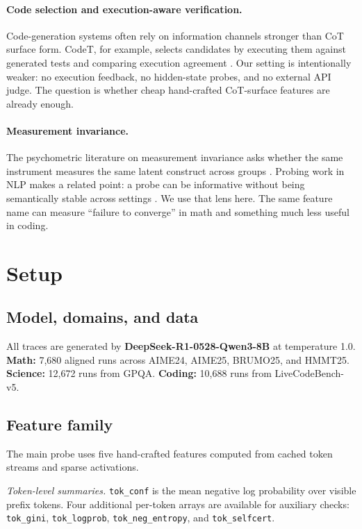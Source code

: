 \documentclass[10pt,twocolumn]{article}
\begin{document}
\paragraph{Code selection and execution-aware verification.}
Code-generation systems often rely on information channels stronger than CoT surface form. CodeT, for example, selects candidates by executing them against generated tests and comparing execution agreement \citep{chen2022codet}. Our setting is intentionally weaker: no execution feedback, no hidden-state probes, and no external API judge. The question is whether cheap hand-crafted CoT-surface features are already enough.

\paragraph{Measurement invariance.}
The psychometric literature on measurement invariance asks whether the same instrument measures the same latent construct across groups \citep{vandenberg2000review}. Probing work in NLP makes a related point: a probe can be informative without being semantically stable across settings \citep{belinkov2022probing}. We use that lens here. The same feature name can measure ``failure to converge'' in math and something much less useful in coding.

\section{Setup}
\label{sec:setup}

\subsection{Model, domains, and data}

All traces are generated by \textbf{DeepSeek-R1-0528-Qwen3-8B} at temperature 1.0.
\textbf{Math:} 7,680 aligned runs across AIME24, AIME25, BRUMO25, and HMMT25.
\textbf{Science:} 12,672 runs from GPQA.
\textbf{Coding:} 10,688 runs from LiveCodeBench-v5.

\subsection{Feature family}

The main probe uses five hand-crafted features computed from cached token streams and sparse activations.

\textit{Token-level summaries.}
\texttt{tok\_conf} is the mean negative log probability over visible prefix tokens. Four additional per-token arrays are available for auxiliary checks: \texttt{tok\_gini}, \texttt{tok\_logprob}, \texttt{tok\_neg\_entropy}, and \texttt{tok\_selfcert}.
\end{document}
